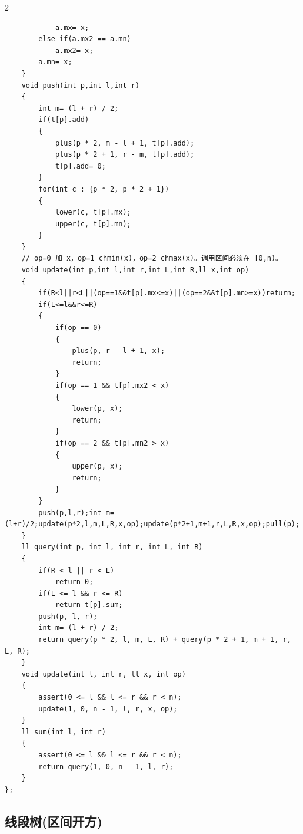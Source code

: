 \documentclass[UTF8,fontset=fandol,a4paper,twoside]{ctexart}
\begin{document}
\begin{multicols}{2}
\begin{lstlisting}
            a.mx= x;
        else if(a.mx2 == a.mn)
            a.mx2= x;
        a.mn= x;
    }
    void push(int p,int l,int r)
    {
        int m= (l + r) / 2;
        if(t[p].add)
        {
            plus(p * 2, m - l + 1, t[p].add);
            plus(p * 2 + 1, r - m, t[p].add);
            t[p].add= 0;
        }
        for(int c : {p * 2, p * 2 + 1})
        {
            lower(c, t[p].mx);
            upper(c, t[p].mn);
        }
    }
    // op=0 加 x，op=1 chmin(x)，op=2 chmax(x)。调用区间必须在 [0,n)。
    void update(int p,int l,int r,int L,int R,ll x,int op)
    {
        if(R<l||r<L||(op==1&&t[p].mx<=x)||(op==2&&t[p].mn>=x))return;
        if(L<=l&&r<=R)
        {
            if(op == 0)
            {
                plus(p, r - l + 1, x);
                return;
            }
            if(op == 1 && t[p].mx2 < x)
            {
                lower(p, x);
                return;
            }
            if(op == 2 && t[p].mn2 > x)
            {
                upper(p, x);
                return;
            }
        }
        push(p,l,r);int m=(l+r)/2;update(p*2,l,m,L,R,x,op);update(p*2+1,m+1,r,L,R,x,op);pull(p);
    }
    ll query(int p, int l, int r, int L, int R)
    {
        if(R < l || r < L)
            return 0;
        if(L <= l && r <= R)
            return t[p].sum;
        push(p, l, r);
        int m= (l + r) / 2;
        return query(p * 2, l, m, L, R) + query(p * 2 + 1, m + 1, r, L, R);
    }
    void update(int l, int r, ll x, int op)
    {
        assert(0 <= l && l <= r && r < n);
        update(1, 0, n - 1, l, r, x, op);
    }
    ll sum(int l, int r)
    {
        assert(0 <= l && l <= r && r < n);
        return query(1, 0, n - 1, l, r);
    }
};
\end{lstlisting}
\subsection{线段树(区间开方)}


\end{multicols}
\end{document}
